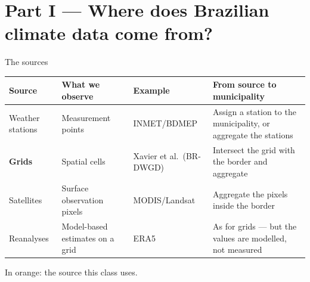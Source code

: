 \documentclass[aspectratio=169,10pt]{beamer}
\newcommand{\dsub}[1]{{\scriptsize\color{climgrey}#1}}
\begin{document}
\section{Part I — Where does Brazilian climate data come from?}

\begin{frame}{The sources}
  \vfill
  \begin{center}
    \small
    \setlength{\tabcolsep}{4pt}
    \renewcommand{\arraystretch}{1.45}
    \begin{tabular}{@{}L{0.19\textwidth}L{0.24\textwidth}L{0.17\textwidth}L{0.33\textwidth}@{}}
      \toprule
      \textbf{Source} & \textbf{What we observe} & \textbf{Example} &
        \textbf{From source to municipality} \\
      \midrule
       Weather stations & Measurement points &
        INMET/BDMEP &
        Assign a station to the municipality, or aggregate the stations \\
      \textcolor{climorange}{\bfseries Grids} & Spatial cells &
        Xavier et al.\ \dsub{(BR-DWGD)} &
        Intersect the grid with the border and aggregate \\
      Satellites & Surface observation pixels &
        MODIS/Landsat &
        Aggregate the pixels inside the border \\
      Reanalyses & Model-based estimates on a grid &
        ERA5 &
        As for grids --- but the values are modelled, not measured \\
      \bottomrule
    \end{tabular}

    \vspace{6pt}
    \dsub{In orange: the source this class uses.}
  \end{center}
  \vfill
\end{frame}
\end{document}
